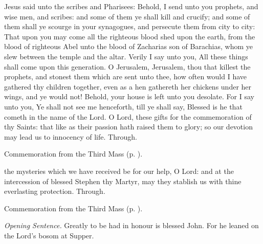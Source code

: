  Jesus said unto the scribes and Pharisees: Behold, I send unto you prophets, and wise men, and scribes: and some of them ye shall kill and crucify; and some of them shall ye scourge in your synagogues, and persecute them from city to city: That upon you may come all the righteous blood shed upon the earth, from the blood of righteous Abel unto the blood of Zacharias son of Barachias, whom ye slew between the temple and the altar. Verily I say unto you, All these things shall come upon this generation. O Jerusalem, Jerusalem, thou that killest the prophets, and stonest them which are sent unto thee, how often would I have gathered thy children together, even as a hen gathereth her chickens under her wings, and ye would not! Behold, your house is left unto you desolate. For I say unto you, Ye shall not see me henceforth, till ye shall say, Blessed is he that cometh in the name of the Lord.
\secret
{} O Lord, these gifts for the commemoration of thy Saints: that like as their passion hath raised them to glory; so our devotion may lead us to innocency of life. Through.
\begin{rubric}
    Commemoration  from the Third Mass (p. \pageref{NativityMassIIISecret}).
\end{rubric}
\postcommunion
{} the mysteries which we have received be for our help, O Lord: and at the intercession of blessed Stephen thy Martyr, may they stablish us with thine everlasting protection. Through.
\begin{rubric}
    Commemoration  from the Third Mass (p. \pageref{NativityMassIIIPostcommunion}).
\end{rubric}


\clearpage
{}
\par\noindent
\textit{Opening Sentence.} Greatly to be had in honour is blessed John. For he leaned on the Lord's bosom at Supper.

